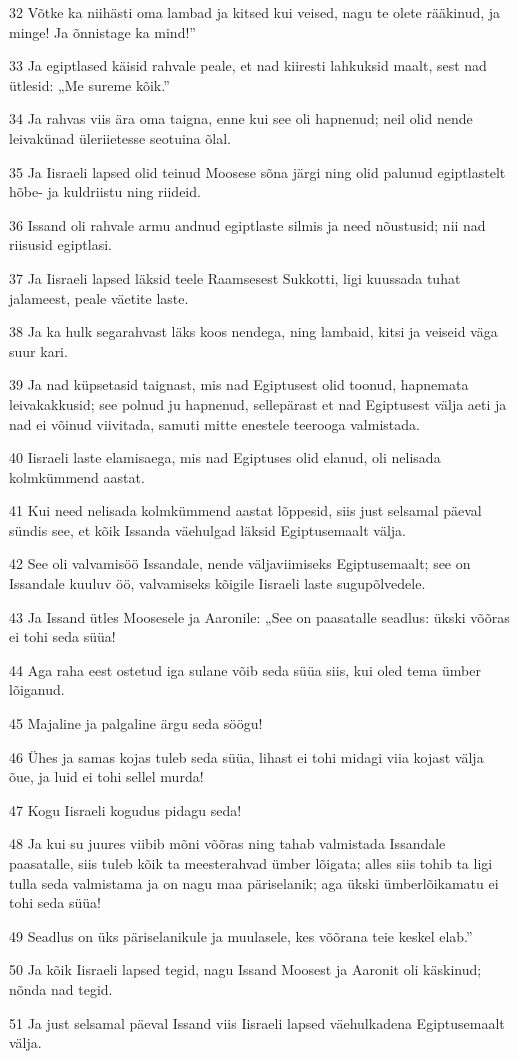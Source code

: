 \par 32 Võtke ka niihästi oma lambad ja kitsed kui veised, nagu te olete rääkinud, ja minge! Ja õnnistage ka mind!”
\par 33 Ja egiptlased käisid rahvale peale, et nad kiiresti lahkuksid maalt, sest nad ütlesid: „Me sureme kõik.”
\par 34 Ja rahvas viis ära oma taigna, enne kui see oli hapnenud; neil olid nende leivakünad üleriietesse seotuina õlal.
\par 35 Ja Iisraeli lapsed olid teinud Moosese sõna järgi ning olid palunud egiptlastelt hõbe- ja kuldriistu ning riideid.
\par 36 Issand oli rahvale armu andnud egiptlaste silmis ja need nõustusid; nii nad riisusid egiptlasi.
\par 37 Ja Iisraeli lapsed läksid teele Raamsesest Sukkotti, ligi kuussada tuhat jalameest, peale väetite laste.
\par 38 Ja ka hulk segarahvast läks koos nendega, ning lambaid, kitsi ja veiseid väga suur kari.
\par 39 Ja nad küpsetasid taignast, mis nad Egiptusest olid toonud, hapnemata leivakakkusid; see polnud ju hapnenud, sellepärast et nad Egiptusest välja aeti ja nad ei võinud viivitada, samuti mitte enestele teerooga valmistada.
\par 40 Iisraeli laste elamisaega, mis nad Egiptuses olid elanud, oli nelisada kolmkümmend aastat.
\par 41 Kui need nelisada kolmkümmend aastat lõppesid, siis just selsamal päeval sündis see, et kõik Issanda väehulgad läksid Egiptusemaalt välja.
\par 42 See oli valvamisöö Issandale, nende väljaviimiseks Egiptusemaalt; see on Issandale kuuluv öö, valvamiseks kõigile Iisraeli laste sugupõlvedele.
\par 43 Ja Issand ütles Moosesele ja Aaronile: „See on paasatalle seadlus: ükski võõras ei tohi seda süüa!
\par 44 Aga raha eest ostetud iga sulane võib seda süüa siis, kui oled tema ümber lõiganud.
\par 45 Majaline ja palgaline ärgu seda söögu!
\par 46 Ühes ja samas kojas tuleb seda süüa, lihast ei tohi midagi viia kojast välja õue, ja luid ei tohi sellel murda!
\par 47 Kogu Iisraeli kogudus pidagu seda!
\par 48 Ja kui su juures viibib mõni võõras ning tahab valmistada Issandale paasatalle, siis tuleb kõik ta meesterahvad ümber lõigata; alles siis tohib ta ligi tulla seda valmistama ja on nagu maa päriselanik; aga ükski ümberlõikamatu ei tohi seda süüa!
\par 49 Seadlus on üks päriselanikule ja muulasele, kes võõrana teie keskel elab.”
\par 50 Ja kõik Iisraeli lapsed tegid, nagu Issand Moosest ja Aaronit oli käskinud; nõnda nad tegid.
\par 51 Ja just selsamal päeval Issand viis Iisraeli lapsed väehulkadena Egiptusemaalt välja.

